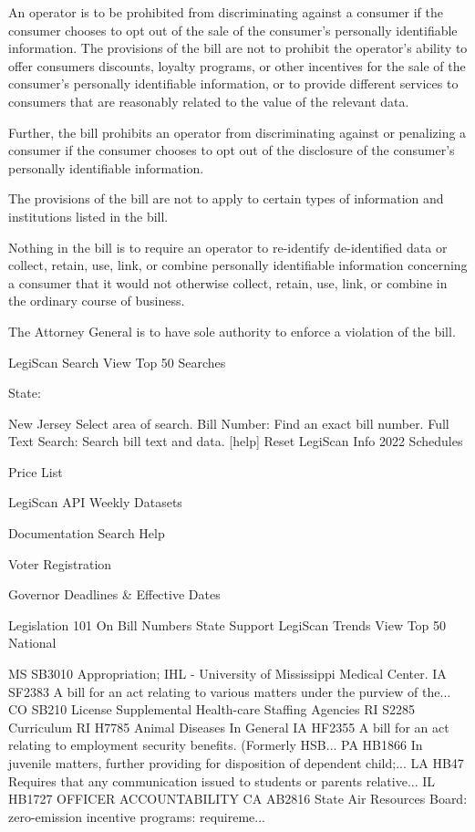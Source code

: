      An operator is to be prohibited from discriminating against a consumer if the consumer chooses to opt out of the sale of the consumer's personally identifiable information. The provisions of the bill are not to prohibit the operator's ability to offer consumers discounts, loyalty programs, or other incentives for the sale of the consumer's personally identifiable information, or to provide different services to consumers that are reasonably related to the value of the relevant data.

     Further, the bill prohibits an operator from discriminating against or penalizing a consumer if the consumer chooses to opt out of the disclosure of the consumer's personally identifiable information.

     The provisions of the bill are not to apply to certain types of information and institutions listed in the bill.

     Nothing in the bill is to require an operator to re-identify de-identified data or collect, retain, use, link, or combine personally identifiable information concerning a consumer that it would not otherwise collect, retain, use, link, or combine in the ordinary course of business.

     The Attorney General is to have sole authority to enforce a violation of the bill.

LegiScan Search
View Top 50 Searches

State:

New Jersey
Select area of search.
Bill Number:
Find an exact bill number.
Full Text Search:
Search bill text and data. [help]
 Reset
LegiScan Info
2022 Schedules

Price List

LegiScan API
Weekly Datasets

Documentation
Search Help

Voter Registration

Governor Deadlines &
Effective Dates

Legislation 101
On Bill Numbers
State Support
LegiScan Trends
View Top 50 National

MS SB3010 Appropriation; IHL - University of Mississippi Medical Center.
IA SF2383 A bill for an act relating to various matters under the purview of the...
CO SB210 License Supplemental Health-care Staffing Agencies
RI S2285 Curriculum
RI H7785 Animal Diseases In General
IA HF2355 A bill for an act relating to employment security benefits. (Formerly HSB...
PA HB1866 In juvenile matters, further providing for disposition of dependent child;...
LA HB47 Requires that any communication issued to students or parents relative...
IL HB1727 OFFICER ACCOUNTABILITY
CA AB2816 State Air Resources Board: zero-emission incentive programs: requireme...
